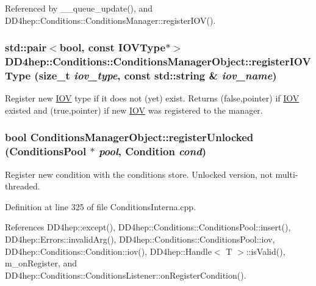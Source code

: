 Referenced by \_\-\_\-queue\_\-update(), and DD4hep::Conditions::ConditionsManager::registerIOV().\hypertarget{class_d_d4hep_1_1_conditions_1_1_conditions_manager_object_ace52e06206ed940af14fd32db36d5d08}{
\subsubsection[{registerIOVType}]{\setlength{\rightskip}{0pt plus 5cm}std::pair$<$bool, const {\bf IOVType}$\ast$$>$ DD4hep::Conditions::ConditionsManagerObject::registerIOVType (size\_\-t {\em iov\_\-type}, \/  const std::string \& {\em iov\_\-name})}}
\label{class_d_d4hep_1_1_conditions_1_1_conditions_manager_object_ace52e06206ed940af14fd32db36d5d08}


Register new \hyperlink{class_d_d4hep_1_1_i_o_v}{IOV} type if it does not (yet) exist. Returns (false,pointer) if \hyperlink{class_d_d4hep_1_1_i_o_v}{IOV} existed and (true,pointer) if new \hyperlink{class_d_d4hep_1_1_i_o_v}{IOV} was registered to the manager. \hypertarget{class_d_d4hep_1_1_conditions_1_1_conditions_manager_object_a745cd16ef676c16294d450c60617fbd1}{
\subsubsection[{registerUnlocked}]{\setlength{\rightskip}{0pt plus 5cm}bool ConditionsManagerObject::registerUnlocked ({\bf ConditionsPool} $\ast$ {\em pool}, \/  {\bf Condition} {\em cond})}}
\label{class_d_d4hep_1_1_conditions_1_1_conditions_manager_object_a745cd16ef676c16294d450c60617fbd1}


Register new condition with the conditions store. Unlocked version, not multi-\/threaded. 

Definition at line 325 of file ConditionsInterna.cpp.

References DD4hep::except(), DD4hep::Conditions::ConditionsPool::insert(), DD4hep::Errors::invalidArg(), DD4hep::Conditions::ConditionsPool::iov, DD4hep::Conditions::Condition::iov(), DD4hep::Handle$<$ T $>$::isValid(), m\_\-onRegister, and DD4hep::Conditions::ConditionsListener::onRegisterCondition().

